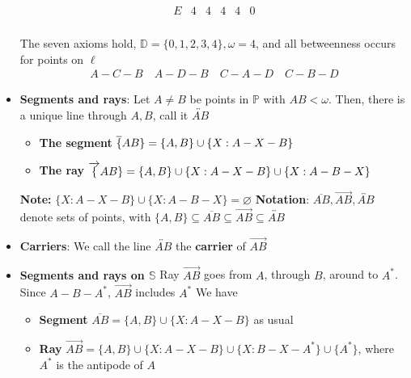 \documentclass{report}
\begin{document}
\begin{itemize}
\begin{align*}
\begin{array}{c|ccccc}
                    E & 4 & 4& 4 & 4 & 0\\
                \end{array}
            \end{align*}
            \bigbreak \noindent 
            \begin{figure}[ht]
                \centering
                \label{fig:ic}
            \end{figure}
            \bigbreak \noindent 
            The seven axioms hold, $\mathbb{D} = \{0,1,2,3,4\}, \omega = 4$, and all betweenness occurs for points on $\ell$
            \begin{align*}
                A-C-B \quad A-D-B \quad C-A-D \quad C-B-D
            \end{align*}
        \item \textbf{Segments and rays}: Let $A\ne B$ be points in $ \mathbb{P}$ with $AB < \omega $. Then, there is a unique line through $A,B$, call it $ \overleftrightarrow{AB}$ 
            \begin{itemize}
                \item \textbf{The segment} $\overline\{AB\} = \{A,B\} \cup \{X: A-X-B\}$
                \item \textbf{The ray} $\overrightarrow\{AB\} = \{A,B\} \cup \{X: A-X-B\} \cup \{X: A-B-X\}$
            \end{itemize}
            \textbf{Note:} $\{X: A-X-B\} \cup \{X: A-B-X\} = \varnothing$
            \bigbreak \noindent 
            \textbf{Notation}: $\overline{AB}, \overrightarrow{AB}, \overleftrightarrow{AB}$ denote sets of points, with $\{A,B\} \subseteq \overline{AB} \subseteq \overrightarrow{AB} \subseteq \overleftrightarrow{AB}$
        \item \textbf{Carriers}: We call the line $\overleftrightarrow{AB}$ the \textbf{carrier} of $\overrightarrow{AB} $
        \item \textbf{Segments and rays on $\mathbb{S}$}
            \bigbreak \noindent 
            \bigbreak \noindent 
            Ray $\overrightarrow{AB}$ goes from $A$, through $B$, around to $A^{*}$. Since $A-B-A^{*}$, $\overrightarrow{AB}$ includes $A^{*} $
            \bigbreak \noindent 
            We have 
            \begin{itemize}
                \item \textbf{Segment} $\overline{AB} = \{A,B\} \cup \{X: A-X-B\}$ as usual
                \item \textbf{Ray} $\overrightarrow{AB} = \{A,B\} \cup \{X: A-X-B\} \cup \{X: B-X-A^{*}\} \cup \{A^{*}\}$, where $A^{*}$ is the antipode of $A$
            \end{itemize}


\end{itemize}
\end{document}

